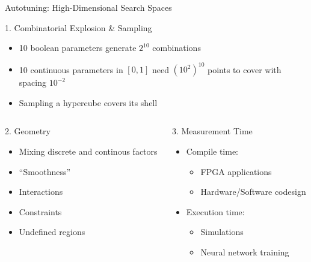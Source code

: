 \documentclass[10pt, compress, aspectratio=169, xcolor={table,usenames,dvipsnames}]{beamer}
\begin{document}
\begin{frame}[label={sec:org850d0ae}]{Autotuning: High-Dimensional Search Spaces}
\begin{block}{1. \alert{Combinatorial Explosion \& Sampling}}
\begin{itemize}
\item 10 boolean parameters generate \(2^{10}\) combinations
\item 10 continuous parameters in \([0, 1]\)  need \((10^{2})^{10}\) points to cover with
spacing \(10^{-2}\)
\item Sampling a hypercube covers its shell
\end{itemize}
\end{block}

\begin{columns}
\begin{column}{0.5\columnwidth}
\begin{block}{2. \alert{Geometry}}
\begin{itemize}
\item Mixing discrete and continous factors
\item ``Smoothness''
\item Interactions
\item Constraints
\item Undefined regions
\end{itemize}
\end{block}
\end{column}

\begin{column}{0.5\columnwidth}
\begin{block}{3. \alert{Measurement Time}}
\begin{itemize}
\item Compile time:
\begin{itemize}
\item FPGA applications
\item Hardware/Software codesign
\end{itemize}
\item Execution time:
\begin{itemize}
\item Simulations
\item Neural network training
\end{itemize}
\end{itemize}
\end{block}
\end{column}
\end{columns}
\end{frame}
\end{document}
